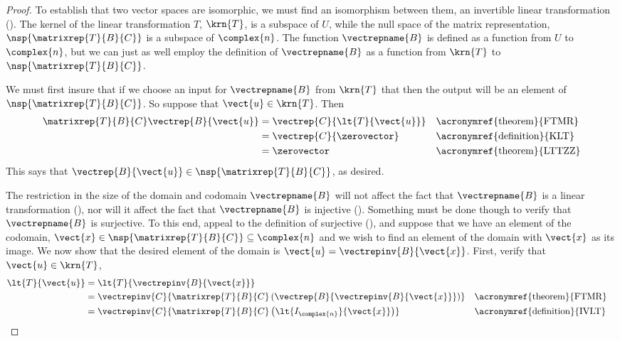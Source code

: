 \begin{proof}
To establish that two vector spaces are isomorphic, we must find an isomorphism between them, an invertible linear transformation ().  The kernel of the linear transformation $T$, $\krn{T}$, is a subspace of $U$, while the null space of the matrix representation, $\nsp{\matrixrep{T}{B}{C}}$ is a subspace of $\complex{n}$.  The function $\vectrepname{B}$ is defined as a function from $U$ to $\complex{n}$, but we can just as well employ the definition of $\vectrepname{B}$ as a function from $\krn{T}$ to $\nsp{\matrixrep{T}{B}{C}}$.\par
%
We must first insure that if we choose an input for $\vectrepname{B}$ from $\krn{T}$ that then the output will be an element of $\nsp{\matrixrep{T}{B}{C}}$.  So suppose that $\vect{u}\in\krn{T}$.  Then
%
\begin{align*}
\matrixrep{T}{B}{C}\vectrep{B}{\vect{u}}
&=\vectrep{C}{\lt{T}{\vect{u}}}&&\text{\acronymref{theorem}{FTMR}}\\
%
&=\vectrep{C}{\zerovector}&&\text{\acronymref{definition}{KLT}}\\
%
&=\zerovector&&\text{\acronymref{theorem}{LTTZZ}}\\
%
\end{align*}
%
This says that $\vectrep{B}{\vect{u}}\in\nsp{\matrixrep{T}{B}{C}}$, as desired.\par
%
The restriction in the size of the domain and codomain $\vectrepname{B}$ will not affect the fact that $\vectrepname{B}$ is a linear transformation (), nor will it affect the fact that $\vectrepname{B}$ is injective ().  Something must be done though to verify that $\vectrepname{B}$ is surjective.  To this end, appeal to the definition of surjective (), and suppose that we have an element of the codomain, $\vect{x}\in\nsp{\matrixrep{T}{B}{C}}\subseteq\complex{n}$ and we wish to find an element of the domain with $\vect{x}$ as its image.  We now show that the desired element of the domain is $\vect{u}=\vectrepinv{B}{\vect{x}}$.  First, verify that $\vect{u}\in\krn{T}$,
%
\begin{align*}
\lt{T}{\vect{u}}
&=\lt{T}{\vectrepinv{B}{\vect{x}}}\\
&=\vectrepinv{C}{\matrixrep{T}{B}{C}\left(\vectrep{B}{\vectrepinv{B}{\vect{x}}}\right)}&&\text{\acronymref{theorem}{FTMR}}\\
&=\vectrepinv{C}{\matrixrep{T}{B}{C}\left(\lt{I_{\complex{n}}}{\vect{x}}\right)}&&\text{\acronymref{definition}{IVLT}}\\

\end{align*}
\end{proof}
